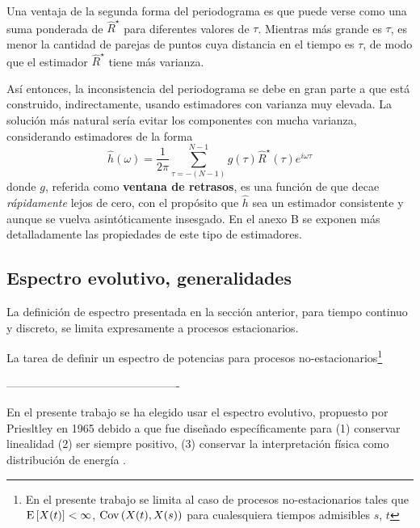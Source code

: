 Una ventaja de la segunda forma del periodograma es que puede verse como una suma ponderada de 
$\widehat{R}^{\star}$ para diferentes valores de $\tau$. 
Mientras más grande es $\tau$, es menor la cantidad de parejas de puntos cuya distancia en el 
tiempo es $\tau$, de modo que el estimador $\widehat{R}^{\star}$ tiene más varianza. 

Así entonces, la inconsistencia del periodograma se debe en gran parte a que está construido,
indirectamente, usando estimadores con varianza muy elevada.
La solución más natural sería evitar los componentes con mucha varianza, considerando estimadores de 
la forma
%
\begin{equation}
\widehat{h}(\omega) = \frac{1}{2 \pi} \sum_{\tau = -(N-1)}^{N-1} g(\tau) \widehat{R}^{\star}(\tau) 
e^{i \omega \tau} 
\label{txt_estimador}
\end{equation}
%
donde $g$, referida como \textbf{ventana de retrasos}, es una función de que decae 
\textit{rápidamente} lejos de cero, con el propósito que $\widehat{h}$ sea un estimador
consistente y aunque se vuelva asintóticamente insesgado.
%
En el anexo B se exponen más detalladamente las propiedades de este tipo de estimadores.


\subsection{Espectro evolutivo, generalidades}

La definición de espectro presentada en la sección anterior, para tiempo continuo y discreto, se
limita expresamente a procesos estacionarios.

La tarea de definir un espectro de potencias para procesos no-estacionarios\footnote{En el 
presente trabajo se limita al caso de procesos no-estacionarios \xt tales que $\mathrm{E}\left[ X(t) \right]<\infty$, 
$\mathrm{Cov}\left( X(t),X(s) \right)$ para cualesquiera tiempos admisibles $s$, $t$} 


----------------------------------------------



En el presente trabajo se ha elegido usar el espectro evolutivo, propuesto por Priesltley en
1965 \cite{Priestley65} debido a que fue diseñado específicamente para (1) conservar linealidad 
(2) ser siempre positivo, (3) conservar la interpretación física como distribución de energía
\cite{Loynes68}.


